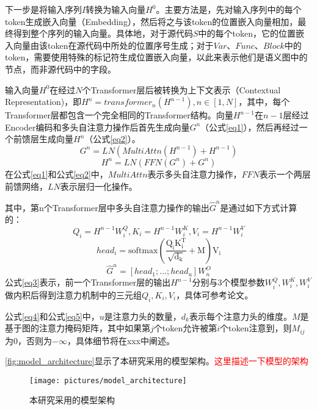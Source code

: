 下一步是将输入序列$I$转换为输入向量$H^0$。主要方法是，先对输入序列中的每个token生成嵌入向量（Embedding），然后将之与该token的位置嵌入向量相加，最终得到整个序列的输入向量。具体地，对于源代码$S$中的每个token，它的位置嵌入向量由该token在源代码中所处的位置序号生成；对于$Var$、$Func$、$Block$中的token，需要使用特殊的标记符生成位置嵌入向量，以此来表示他们是语义图中的节点，而非源代码中的字段。

输入向量$H^0$在经过$N$个Transformer层后被转换为上下文表示（Contextual Representation)，即$H^n=transformer_n(H^{n-1}),n\in[1,N]$，其中，每个Transformer层都包含一个完全相同的Transformer结构。向量$H^{n-1}$在$n-1$层经过Encoder编码和多头自注意力操作\cite{attention}后首先生成向量$G^n$（公式\eqref{eq1}），然后再经过一个前馈层生成向量$H^n$（公式\eqref{eq2}）。
\begin{equation}
    G^n=LN(MultiAttn(H^{n-1})+H^{n-1}) \label{eq1}
\end{equation}
\begin{equation}
H^n=LN(FFN(G^n)+G^n) \label{eq2}
\end{equation}
在公式\eqref{eq1}和公式\eqref{eq2}中，$MultiAttn$表示多头自注意力操作，$FFN$表示一个两层前馈网络，$LN$表示层归一化操作。

其中，第n个Transformer层中多头自注意力操作的输出$\hat{G}^n$是通过如下方式计算的：
\begin{equation}
Q_i=H^{n-1}W_i^Q, K_i=H^{n-1}W_i^K, V_i=H^{n-1}W_i^V \label{eq3}
\end{equation}
\begin{equation}
head_i=\text{softmax}(\frac{\mathrm{Q_iK_i^T}}{\sqrt{\mathrm{d_k}}}+\mathrm{M})\mathrm{V_i} \label{eq4}
\end{equation}
\begin{equation}
\hat{G}^n=[head_1;...;head_u]W_n^O \label{eq5}
\end{equation}
公式\eqref{eq3}表示，前一个Transformer层的输出$H^{n-1}$分别与3个模型参数$W_i^Q,W_i^K,W_i^V$做内积后得到注意力机制中的三元组$Q_i,K_i,V_i$，具体可参考论文\cite{attention}。

公式\eqref{eq4}和公式\eqref{eq5}中，$u$是注意力头的数量，$d_k$表示每个注意力头的维度。$M$是基于图的注意力掩码矩阵，其中如果第$j$个token允许被第$i$个token注意到，则$M_{ij}$为0，否则为$-\infty$，具体细节将在xxx中阐述。


\autoref{fig:model_architecture}显示了本研究采用的模型架构。\textcolor{red}{这里描述一下模型的架构}
\begin{figure}[htbp]
    \centering
    \texttt{[image: pictures/model\_architecture]}
    \caption{\label{fig:model_architecture}本研究采用的模型架构}
\end{figure}
